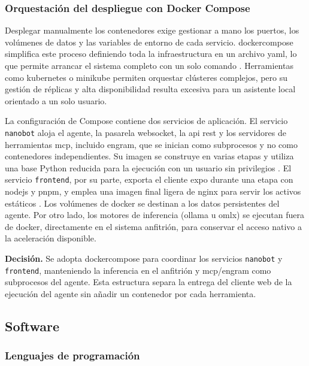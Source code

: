 \subsubsection{Orquestación del despliegue con Docker Compose}

Desplegar manualmente los contenedores exige gestionar a mano los puertos, los volúmenes de datos y las variables de entorno de cada servicio. \Gls{dockercompose} simplifica este proceso definiendo toda la infraestructura en un archivo \gls{yaml}, lo que permite arrancar el sistema completo con un solo comando \cite{docker2024compose}. Herramientas como \gls{kubernetes} o \gls{minikube} permiten orquestar clústeres complejos, pero su gestión de réplicas y alta disponibilidad resulta excesiva para un asistente local orientado a un solo usuario.

La configuración de Compose contiene dos servicios de aplicación. El servicio \texttt{nanobot} aloja el agente, la pasarela \gls{websocket}, la \gls{api} \gls{rest} y los servidores de herramientas \gls{mcp}, incluido \gls{engram}, que se inician como subprocesos y no como contenedores independientes. Su imagen se construye en varias etapas y utiliza una base Python reducida para la ejecución con un usuario sin privilegios \cite{docker2026multistage}. El servicio \texttt{frontend}, por su parte, exporta el cliente \gls{expo} durante una etapa con \gls{nodejs} y \gls{pnpm}, y emplea una imagen final ligera de \gls{nginx} para servir los activos estáticos \cite{nginx2026}. Los volúmenes de \gls{docker} se destinan a los datos persistentes del agente. Por otro lado, los motores de inferencia (\Gls{ollama} u \gls{omlx}) se ejecutan fuera de \gls{docker}, directamente en el sistema anfitrión, para conservar el acceso nativo a la aceleración disponible.

\textbf{Decisión.} Se adopta \gls{dockercompose} para coordinar los servicios \texttt{nanobot} y \texttt{frontend}, manteniendo la inferencia en el anfitrión y \gls{mcp}/\gls{engram} como subprocesos del agente. Esta estructura separa la entrega del cliente web de la ejecución del agente sin añadir un contenedor por cada herramienta.

\subsection{Software}\label{subsec:software-localmind}

\subsubsection{Lenguajes de programación}

